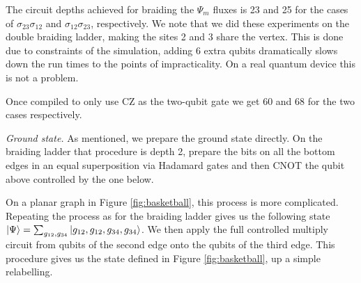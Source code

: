 \documentclass[two column]{article}
\begin{document}
The circuit depths achieved for braiding the $\Psi_m$ fluxes is 23 and 25 for the cases of $\sigma_{23}\sigma_{12}$ and $\sigma_{12}\sigma_{23}$, respectively. We note that we did these experiments on the double braiding ladder, making the sites 2 and 3 share the vertex. This is done due to constraints of the simulation, adding 6 extra qubits dramatically slows down the run times to the points of impracticality. On a real quantum device this is not a problem.

Once compiled to only use CZ as the two-qubit gate we get 60 and 68 for the two cases respectively.

\emph{Ground state.} As mentioned, we prepare the ground state directly. On the braiding ladder that procedure is depth 2, prepare the bits on all the bottom edges in an equal superposition via Hadamard gates and then CNOT the qubit above controlled by the one below. 

On a planar graph in Figure \ref{fig:basketball}, this process is more complicated. Repeating the process as for the braiding ladder gives us the following state $\ket{\Psi} = \sum_{g_{12},g_{34}}\ket{g_{12},g_{12}, g_{34}, g_{34}}$. We then apply the full controlled multiply circuit from qubits of the second edge onto the qubits of the third edge. This procedure gives us the state defined in Figure \ref{fig:basketball}, up a simple relabelling.
\end{document}
